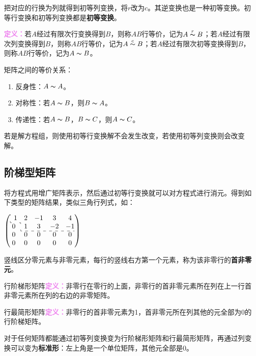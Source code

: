 \documentclass[UTF8, 12pt]{ctexart}
\begin{document}
把对应的行换为列就得到初等列变换，将$r$改为$c$。其逆变换也是一种初等变换。初等行变换和初等列变换都是\textbf{初等变换}。

\textcolor{violet}{\textbf{定义：}}若$A$经过有限次行变换得到$B$，则称$AB$行等价，记为$A\overset{r}{\thicksim}B$；若$A$经过有限次列变换得到$B$，则称$AB$行等价，记为$A\overset{c}{\thicksim}B$；若$A$经过有限次初等变换得到$B$，则称$AB$行等价，记为$A\thicksim B$。

矩阵之间的等价关系：

\begin{enumerate}
    \item 反身性：$A\thicksim A$。
    \item 对称性：若$A\thicksim B$，则$B\thicksim A$。
    \item 传递性：若$A\thicksim B$，$B\thicksim C$，则$A\thicksim C$。
\end{enumerate}

若是解方程组，则使用初等行变换解不会发生改变，若使用初等列变换则会改变解。

\subsection{阶梯型矩阵}

将方程式用增广矩阵表示，然后通过初等行变换就可以对方程式进行消元。得到如下类型的矩阵结果，类似三角行列式，如：

\begin{multicols}{2}
    
    $
    \left(
    \begin{array}{@{} c c c c c @{}}
        \multicolumn{1}{: c}{1} & 2 & -1 &  3 &  4 \\
      \cdashline{1-1}
      0 & \multicolumn{1}{: c}{1} &  3 & -2 & -1 \\
      \cdashline{2-5}
      0 & 0 &  0 &  0 &  0 \\
      0 & 0 &  0 &  0 &  0
    \end{array}
    \right)
    $

    竖线区分零元素与非零元素，每行的竖线右方第一个元素，称为该非零行的\textbf{首非零元}。

\end{multicols}

行阶梯形矩阵\textcolor{violet}{\textbf{定义：}}非零行在零行的上面，非零行的首非零元素所在列在上一行首非零元素所在列的右边的非零矩阵。

行最简形矩阵\textcolor{violet}{\textbf{定义：}}非零行的首非零元素为1，首非零元所在列其他的元全部为0的行阶梯矩阵。

对于任何矩阵都能通过初等列变换变为行阶梯形矩阵和行最简形矩阵，再通过列变换可以变为\textbf{标准形}：左上角是一个单位矩阵，其他元全部是0。
\end{document}

